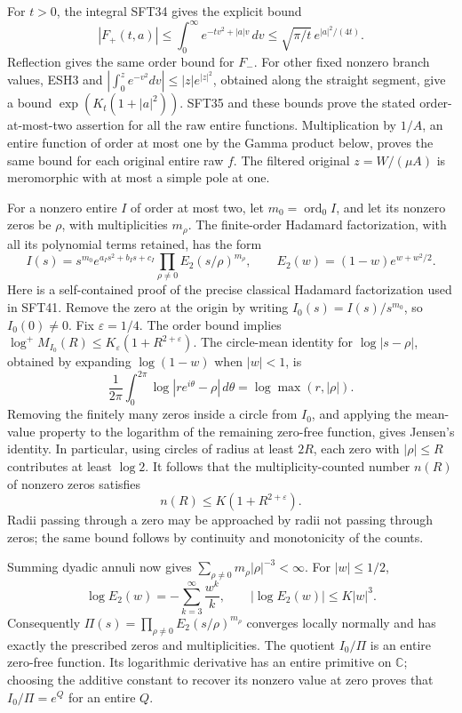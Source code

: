 \documentclass[
  10pt,
  a4paper,
]{article}
\begin{document}
For \(t>0\), the integral SFT34 gives the explicit bound \[
 |F_+(t,a)|\le \int_0^\infty e^{-tv^2+|a|v}\,dv
       \le \sqrt{\pi/t}\,e^{|a|^2/(4t)}.
 \tag{SFT40}
\] Reflection gives the same order bound for \(F_-\). For other fixed
nonzero branch values, ESH3 and
\(\left|\int_0^z e^{-v^2}dv\right|\le |z|e^{|z|^2}\), obtained along the
straight segment, give a bound \(\exp(K_t(1+|a|^2))\). SFT35 and these
bounds prove the stated order-at-most-two assertion for all the raw
entire functions. Multiplication by \(1/A\), an entire function of order
at most one by the Gamma product below, proves the same bound for each
original entire raw \(f\). The filtered original \(z=W/(\mu A)\) is
meromorphic with at most a simple pole at one.

For a nonzero entire \(I\) of order at most two, let
\(m_0=\operatorname{ord}_0 I\), and let its nonzero zeros be \(\rho\),
with multiplicities \(m_\rho\). The finite-order Hadamard factorization,
with all its polynomial terms retained, has the form \[
 I(s)=s^{m_0}e^{a_I s^2+b_I s+c_I}
          \prod_{\rho\ne0}
             E_2(s/\rho)^{m_\rho},\qquad
 E_2(w)=(1-w)e^{w+w^2/2}.
 \tag{SFT41}
\] Here is a self-contained proof of the precise classical Hadamard
factorization used in SFT41. Remove the zero at the origin by writing
\(I_0(s)=I(s)/s^{m_0}\), so \(I_0(0)\ne0\). Fix \(\varepsilon=1/4\). The
order bound implies
\(\log^+M_{I_0}(R)\le K_\varepsilon(1+R^{2+\varepsilon})\). The
circle-mean identity for \(\log|s-\rho|\), obtained by expanding
\(\log(1-w)\) when \(|w|<1\), is \[
 \frac1{2\pi}\int_0^{2\pi}
      \log|r e^{i\theta}-\rho|\,d\theta
       =\log\max(r,|\rho|).
\] Removing the finitely many zeros inside a circle from \(I_0\), and
applying the mean-value property to the logarithm of the remaining
zero-free function, gives Jensen's identity. In particular, using
circles of radius at least \(2R\), each zero with \(|\rho|\le R\)
contributes at least \(\log2\). It follows that the multiplicity-counted
number \(n(R)\) of nonzero zeros satisfies \[
 n(R)\le K(1+R^{2+\varepsilon}).
\] Radii passing through a zero may be approached by radii not passing
through zeros; the same bound follows by continuity and monotonicity of
the counts.

Summing dyadic annuli now gives
\(\sum_{\rho\ne0}m_\rho|\rho|^{-3}<\infty\). For \(|w|\le1/2\), \[
 \log E_2(w)=-\sum_{k=3}^{\infty}\frac{w^k}{k},
 \qquad |\log E_2(w)|\le K|w|^3.
\] Consequently \(\Pi(s)=\prod_{\rho\ne0}E_2(s/\rho)^{m_\rho}\)
converges locally normally and has exactly the prescribed zeros and
multiplicities. The quotient \(I_0/\Pi\) is an entire zero-free
function. Its logarithmic derivative has an entire primitive on
\(\mathbb C\); choosing the additive constant to recover its nonzero
value at zero proves that \(I_0/\Pi=e^Q\) for an entire \(Q\).
\end{document}
